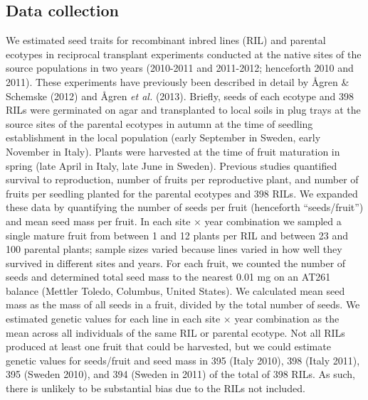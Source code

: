 \documentclass[]{article}
\begin{document}
\hypertarget{data-collection}{%
\subsection{Data collection}\label{data-collection}}

We estimated seed traits for recombinant inbred lines (RIL) and parental ecotypes in reciprocal transplant experiments conducted at the native sites of the source populations in two years (2010-2011 and 2011-2012; henceforth 2010 and 2011). These experiments have previously been described in detail by Ågren \& Schemske (2012) and Ågren \emph{et al.} (2013). Briefly, seeds of each ecotype and 398 RILs were germinated on agar and transplanted to local soils in plug trays at the source sites of the parental ecotypes in autumn at the time of seedling establishment in the local population (early September in Sweden, early November in Italy). Plants were harvested at the time of fruit maturation in spring (late April in Italy, late June in Sweden). Previous studies quantified survival to reproduction, number of fruits per reproductive plant, and number of fruits per seedling planted for the parental ecotypes and 398 RILs. We expanded these data by quantifying the number of seeds per fruit (henceforth ``seeds/fruit'') and mean seed mass per fruit. In each site × year combination we sampled a single mature fruit from between 1 and 12 plants per RIL and between 23 and 100 parental plants; sample sizes varied because lines varied in how well they survived in different sites and years. For each fruit, we counted the number of seeds and determined total seed mass to the nearest 0.01 mg on an AT261 balance (Mettler Toledo, Columbus, United States). We calculated mean seed mass as the mass of all seeds in a fruit, divided by the total number of seeds. We estimated genetic values for each line in each site × year combination as the mean across all individuals of the same RIL or parental ecotype. Not all RILs produced at least one fruit that could be harvested, but we could estimate genetic values for seeds/fruit and seed mass in 395 (Italy 2010), 398 (Italy 2011), 395 (Sweden 2010), and 394 (Sweden in 2011) of the total of 398 RILs. As such, there is unlikely to be substantial bias due to the RILs not included.
\end{document}
